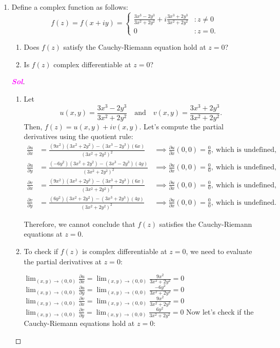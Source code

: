 \documentclass{article}
\theoremstyle{definition}
\newcommand{\of}[1]{\left( #1 \right)}
\newcommand{\sol}{\textcolor{magenta}{\bf Sol}}
\begin{document}
\begin{enumerate}
		\item Define a complex function as follows: \[
		f\of{z}=f\of{x+iy}=\begin{cases}
		\displaystyle\frac{3x^3-2y^3}{3x^2+2y^2}+i\frac{3x^3+2y^3}{3x^2+2y^2} &: z\neq 0\\
		0 &: z=0.
		\end{cases}
		\] \begin{enumerate}
			\item Does $f(z)$ satisfy the Cauchy-Riemann equation hold at $z=0$?
			\item Is $f(z)$ complex differentiable at $z=0$?
		\end{enumerate}
		\begin{proof}[\sol]
			\begin{enumerate}
				\item Let \[
				u(x, y) = \frac{3x^3 - 2y^3}{3x^2 + 2y^2}\quad\text{and}\quad v(x, y) = \frac{3x^3 + 2y^3}{3x^2 + 2y^2}.
				\] Then, $f(z) = u(x, y) + iv(x, y)$. Let's compute the partial derivatives using the quotient rule: \begin{align*}
				\frac{\partial u}{\partial x} &= \frac{(9x^2)(3x^2 + 2y^2) - (3x^3 - 2y^3)(6x)}{(3x^2 + 2y^2)^2} &\implies\frac{\partial u}{\partial x}\of{0,0}=\frac{0}{0},\ \text{which is undefined},\\
				\frac{\partial u}{\partial y} &= \frac{(-6y^2)(3x^2 + 2y^2) - (3x^3 - 2y^3)(4y)}{(3x^2 + 2y^2)^2}&\implies\frac{\partial u}{\partial x}\of{0,0}=\frac{0}{0},\ \text{which is undefined},\\
				\frac{\partial v}{\partial x} &= \frac{(9x^2)(3x^2 + 2y^2) - (3x^3 + 2y^3)(6x)}{(3x^2 + 2y^2)^2}&\implies\frac{\partial u}{\partial x}\of{0,0}=\frac{0}{0},\ \text{which is undefined},\\
				\frac{\partial v}{\partial y} &= \frac{(6y^2)(3x^2 + 2y^2) - (3x^3 + 2y^3)(4y)}{(3x^2 + 2y^2)^2}&\implies\frac{\partial u}{\partial x}\of{0,0}=\frac{0}{0},\ \text{which is undefined}.
				\end{align*}
				
				Therefore, we cannot conclude that $f(z)$ satisfies the Cauchy-Riemann equations at $z = 0$.
				
				\item To check if $f(z)$ is complex differentiable at $z = 0$, we need to evaluate the partial derivatives at $z = 0$:
				
				$\lim_{(x,y) \to (0,0)} \frac{\partial u}{\partial x} = \lim_{(x,y) \to (0,0)} \frac{9x^2}{3x^2 + 2y^2} = 0$
				$\lim_{(x,y) \to (0,0)} \frac{\partial u}{\partial y} = \lim_{(x,y) \to (0,0)} \frac{-6y^2}{3x^2 + 2y^2} = 0$
				$\lim_{(x,y) \to (0,0)} \frac{\partial v}{\partial x} = \lim_{(x,y) \to (0,0)} \frac{9x^2}{3x^2 + 2y^2} = 0$
				$\lim_{(x,y) \to (0,0)} \frac{\partial v}{\partial y} = \lim_{(x,y) \to (0,0)} \frac{6y^2}{3x^2 + 2y^2} = 0$
				Now let's check if the Cauchy-Riemann equations hold at $z = 0$:
				

\end{enumerate}
\end{proof}
\end{enumerate}
\end{document}
